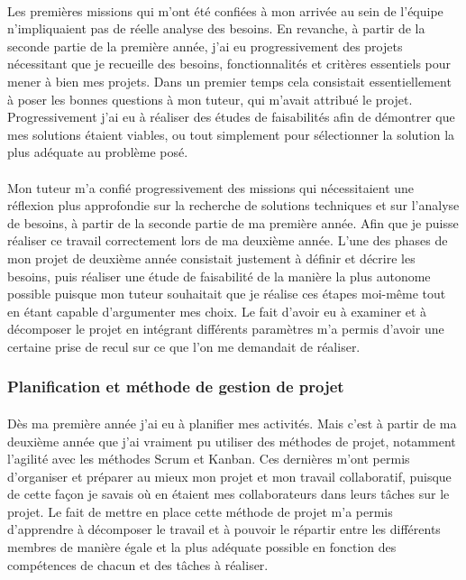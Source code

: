 \documentclass[12pt,a4paper]{report}
\begin{document}
\paragraph*{}Les premières missions qui m'ont été confiées à mon arrivée au sein de l'équipe n'impliquaient pas de réelle analyse des besoins. En revanche, à partir de la seconde partie de la première année, j'ai eu progressivement des projets nécessitant que je recueille des besoins, fonctionnalités et critères essentiels pour mener à bien mes projets. Dans un premier temps cela consistait essentiellement à poser les bonnes questions à mon tuteur, qui m'avait attribué le projet. Progressivement j'ai eu à réaliser des études de faisabilités afin de démontrer que mes solutions étaient viables, ou tout simplement pour sélectionner la solution la plus adéquate au problème posé.
\paragraph*{}Mon tuteur m'a confié progressivement des missions qui nécessitaient une réflexion plus approfondie sur la recherche de solutions techniques et sur l'analyse de besoins, à partir de la seconde partie de ma première année. Afin que je puisse réaliser ce travail correctement lors de ma deuxième année. L'une des phases de mon projet de deuxième année consistait justement à définir et décrire les besoins, puis réaliser une étude de faisabilité de la manière la plus autonome possible puisque mon tuteur souhaitait que je réalise ces étapes moi-même tout en étant capable d'argumenter mes choix. Le fait d'avoir eu à examiner et à décomposer le projet en intégrant différents paramètres m'a permis d'avoir une certaine prise de recul sur ce que l'on me demandait de réaliser. \\
\subsubsection{Planification et méthode de gestion de projet}
\paragraph*{}Dès ma première année j'ai eu à planifier mes activités. Mais c'est à partir de ma deuxième année que j'ai vraiment pu utiliser des méthodes de projet, notamment l'agilité avec les méthodes Scrum et Kanban. Ces dernières m'ont permis d'organiser et préparer au mieux mon projet et mon travail collaboratif, puisque de cette façon je savais où en étaient mes collaborateurs dans leurs tâches sur le projet. Le fait de mettre en place cette méthode de projet m'a permis d'apprendre à décomposer le travail et à pouvoir le répartir entre les différents membres de manière égale et la plus adéquate possible en fonction des compétences de chacun et des tâches à réaliser.
\end{document}

